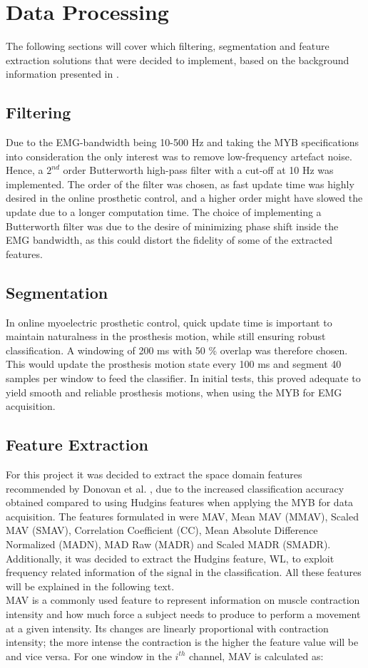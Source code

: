 \section{Data Processing}
The following sections will cover which filtering, segmentation and feature extraction solutions that were decided to implement, based on the background information presented in . 

\subsection{Filtering}
Due to the EMG-bandwidth being 10-500 Hz and taking the MYB specifications into consideration the only interest was to remove low-frequency artefact noise. Hence, a $2^{nd}$ order Butterworth high-pass filter with a cut-off at 10 Hz was implemented. The order of the filter was chosen, as fast update time was highly desired in the online prosthetic control, and a higher order might have slowed the update due to a longer computation time. The choice of implementing a Butterworth filter was due to the desire of minimizing phase shift inside the EMG bandwidth, as this could distort the fidelity of some of the extracted features. 

\subsection{Segmentation}
In online myoelectric prosthetic control, quick update time is important to maintain naturalness in the prosthesis motion, while still ensuring robust classification. A windowing of 200 ms with 50 \% overlap was therefore chosen. This would update the prosthesis motion state every 100 ms and segment 40 samples per window to feed the classifier. In initial tests, this proved adequate to yield smooth and reliable prosthesis motions, when using the MYB for EMG acquisition. 

\subsection{Feature Extraction}
For this project it was decided to extract the space domain features recommended by Donovan et al. \cite{Donovan2017}, due to the increased classification accuracy obtained compared to using Hudgins features when applying the MYB for data acquisition. The features formulated in \cite{Donovan2017} were MAV, Mean MAV (MMAV), Scaled MAV (SMAV), Correlation Coefficient (CC), Mean Absolute Difference Normalized (MADN), MAD Raw (MADR) and Scaled MADR (SMADR). Additionally, it was decided to extract the Hudgins feature, WL, to exploit frequency related information of the signal in the classification. All these features will be explained in the following text. \\
MAV is a commonly used feature to represent information on muscle contraction intensity and how much force a subject needs to produce to perform a movement at a given intensity. Its changes are linearly proportional with contraction intensity; the more intense the contraction is the higher the feature value will be and vice versa. For one window in the $i^{th}$ channel, MAV is calculated as:

